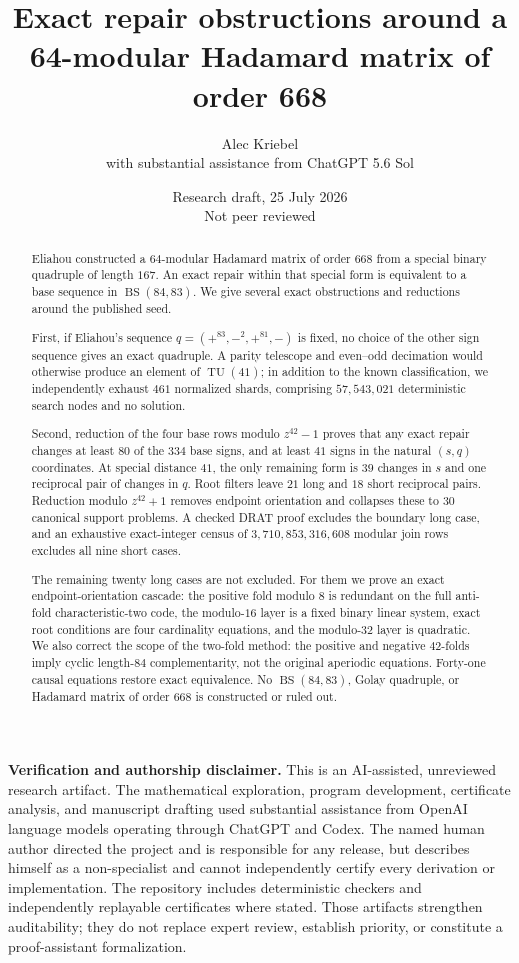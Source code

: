 \documentclass[11pt]{article}
\title{Exact repair obstructions around a\\
64-modular Hadamard matrix of order 668}
\author{Alec Kriebel\\[2pt]\large with substantial assistance from ChatGPT 5.6 Sol}
\date{Research draft, 25 July 2026\\Not peer reviewed}
\theoremstyle{remark}
\newcommand{\BS}{\operatorname{BS}}
\newcommand{\TU}{\operatorname{TU}}
\begin{document}
\maketitle

\begin{abstract}
Eliahou constructed a $64$-modular Hadamard matrix of order $668$ from a
special binary quadruple of length $167$.  An exact repair within that
special form is equivalent to a base sequence in $\BS(84,83)$.  We give
several exact obstructions and reductions around the published seed.

First, if Eliahou's sequence $q=(+^{83},-^2,+^{81},-)$ is fixed, no choice
of the other sign sequence gives an exact quadruple.  A parity telescope
and even--odd decimation would otherwise produce an element of
$\TU(41)$; in addition to the known classification, we independently
exhaust $461$ normalized shards, comprising $57{,}543{,}021$ deterministic
search nodes and no solution.

Second, reduction of the four base rows modulo $z^{42}-1$ proves that any
exact repair changes at least $80$ of the $334$ base signs, and at least
$41$ signs in the natural $(s,q)$ coordinates.  At special distance $41$,
the only remaining form is $39$ changes in $s$ and one reciprocal pair of
changes in $q$.  Root filters leave $21$ long and $18$ short reciprocal
pairs.  Reduction modulo $z^{42}+1$ removes endpoint orientation and
collapses these to $30$ canonical support problems.  A checked DRAT proof
excludes the boundary long case, and an exhaustive exact-integer census of
$3{,}710{,}853{,}316{,}608$ modular join rows excludes all nine short
cases.

The remaining twenty long cases are not excluded.  For them we prove an
exact endpoint-orientation cascade: the positive fold modulo $8$ is
redundant on the full anti-fold characteristic-two code, the modulo-$16$
layer is a fixed binary linear system, exact root conditions are four
cardinality equations, and the modulo-$32$ layer is quadratic.  We also
correct the scope of the two-fold method: the positive and negative
$42$-folds imply cyclic length-$84$ complementarity, not the original
aperiodic equations.  Forty-one causal equations restore exact
equivalence.  No $\BS(84,83)$, Golay quadruple, or Hadamard matrix of order
$668$ is constructed or ruled out.
\end{abstract}

\noindent\textbf{Verification and authorship disclaimer.}
This is an AI-assisted, unreviewed research artifact.  The mathematical
exploration, program development, certificate analysis, and manuscript
drafting used substantial assistance from OpenAI language models operating
through ChatGPT and Codex.  The named human author directed the project and
is responsible for any release, but describes himself as a non-specialist
and cannot independently certify every derivation or implementation.
The repository includes deterministic checkers and independently replayable
certificates where stated.  Those artifacts strengthen auditability; they
do not replace expert review, establish priority, or constitute a
proof-assistant formalization.
\end{document}
